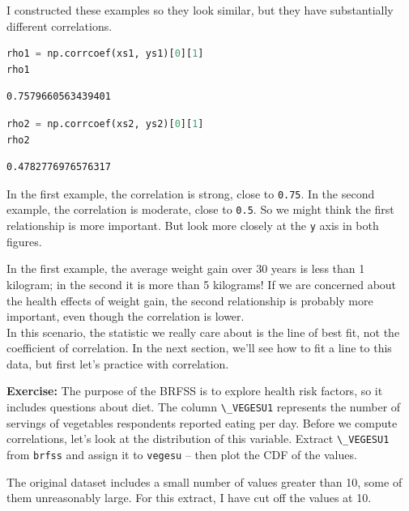 I constructed these examples so they look similar, but they have
substantially different correlations.

\begin{lstlisting}[language=Python,style=source]
rho1 = np.corrcoef(xs1, ys1)[0][1]
rho1
\end{lstlisting}

\begin{lstlisting}[style=output]
0.7579660563439401
\end{lstlisting}

\begin{lstlisting}[language=Python,style=source]
rho2 = np.corrcoef(xs2, ys2)[0][1]
rho2
\end{lstlisting}

\begin{lstlisting}[style=output]
0.4782776976576317
\end{lstlisting}

In the first example, the correlation is strong, close to
\passthrough{\lstinline!0.75!}. In the second example, the correlation
is moderate, close to \passthrough{\lstinline!0.5!}. So we might think
the first relationship is more important. But look more closely at the
\passthrough{\lstinline!y!} axis in both figures.

In the first example, the average weight gain over 30 years is less than
1 kilogram; in the second it is more than 5 kilograms! If we are
concerned about the health effects of weight gain, the second
relationship is probably more important, even though the correlation is
lower.\\
In this scenario, the statistic we really care about is the line of best
fit, not the coefficient of correlation. In the next section, we'll see
how to fit a line to this data, but first let's practice with
correlation.

\textbf{Exercise:} The purpose of the BRFSS is to explore health risk
factors, so it includes questions about diet. The column
\passthrough{\lstinline!\_VEGESU1!} represents the number of servings of
vegetables respondents reported eating per day. Before we compute
correlations, let's look at the distribution of this variable. Extract
\passthrough{\lstinline!\_VEGESU1!} from \passthrough{\lstinline!brfss!}
and assign it to \passthrough{\lstinline!vegesu!} -- then plot the CDF
of the values.

The original dataset includes a small number of values greater than 10,
some of them unreasonably large. For this extract, I have cut off the
values at 10.

